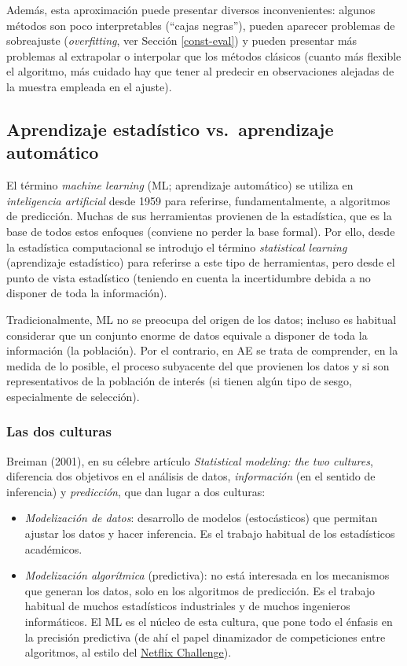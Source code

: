 \documentclass[
]{book}
\theoremstyle{break}
\theoremstyle{nonumberplain}
\begin{document}
Además, esta aproximación puede presentar diversos inconvenientes: algunos métodos son poco interpretables (``cajas negras''), pueden aparecer problemas de sobreajuste (\emph{overfitting}, ver Sección \ref{const-eval}) y pueden presentar más problemas al extrapolar o interpolar que los métodos clásicos (cuanto más flexible el algoritmo, más cuidado hay que tener al predecir en observaciones alejadas de la muestra empleada en el ajuste).

\subsection{Aprendizaje estadístico vs.~aprendizaje automático}\label{aprendizaje-estaduxedstico-vs.-aprendizaje-automuxe1tico}

El término \emph{machine learning} (ML; aprendizaje automático) se utiliza en \emph{inteligencia artificial} desde 1959 para referirse, fundamentalmente, a algoritmos de predicción. Muchas de sus herramientas provienen de la estadística, que es la base de todos estos enfoques (conviene no perder la base formal). Por ello, desde la estadística computacional se introdujo el término \emph{statistical learning} (aprendizaje estadístico) para referirse a este tipo de herramientas, pero desde el punto de vista estadístico (teniendo en cuenta la incertidumbre debida a no disponer de toda la información).

Tradicionalmente, ML no se preocupa del origen de los datos; incluso es habitual considerar que un conjunto enorme de datos equivale a disponer de toda la información (la población). Por el contrario, en AE se trata de comprender, en la medida de lo posible, el proceso subyacente del que provienen los datos y si son representativos de la población de interés (si tienen algún tipo de sesgo, especialmente de selección).

\subsubsection{Las dos culturas}\label{las-dos-culturas}

Breiman (2001), en su célebre artículo \emph{Statistical modeling: the two cultures}, diferencia dos objetivos en el análisis de datos, \emph{información} (en el sentido de inferencia) y \emph{predicción}, que dan lugar a dos culturas:

\begin{itemize}
\item
  \emph{Modelización de datos}: desarrollo de modelos (estocásticos) que permitan ajustar los datos y hacer inferencia. Es el trabajo habitual de los estadísticos académicos.
\item
  \emph{Modelización algorítmica} (predictiva): no está interesada en los mecanismos que generan los datos, solo en los algoritmos de predicción. Es el trabajo habitual de muchos estadísticos industriales y de muchos ingenieros informáticos. El ML es el núcleo de esta cultura, que pone todo el énfasis en la precisión predictiva (de ahí el papel dinamizador de competiciones entre algoritmos, al estilo del \href{https://en.wikipedia.org/wiki/Netflix_Prize}{Netflix Challenge}).
\end{itemize}
\end{document}
